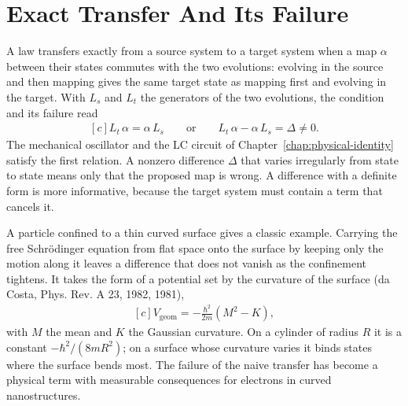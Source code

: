 \documentclass[11pt,oneside]{book}
\newenvironment{centeredalign}{\[\begin{gathered}[c]}{\end{gathered}\]}
\begin{document}
\section{Exact Transfer And Its Failure}
A law transfers exactly from a source system to a target system when a map \(\alpha\) between their states commutes with
the two evolutions: evolving in the source and then mapping gives the same target state as mapping first and evolving in
the target. With \(L_s\) and \(L_t\) the generators of the two evolutions, the condition and its failure read
\begin{centeredalign}
L_t\,\alpha=\alpha\,L_s\qquad\text{or}\qquad L_t\,\alpha-\alpha\,L_s=\Delta\ne0 .
\end{centeredalign}
The mechanical oscillator and the LC circuit of Chapter~\ref{chap:physical-identity} satisfy the first relation. A
nonzero difference \(\Delta\) that varies irregularly from state to state means only that the proposed map is wrong. A
difference with a definite form is more informative, because the target system must contain a term that cancels it.

A particle confined to a thin curved surface gives a classic example. Carrying the free Schr\"odinger equation from
flat space onto the surface by keeping only the motion along it leaves a difference that does not vanish as the
confinement tightens. It takes the form of a potential set by the curvature of the surface (da Costa, Phys. Rev. A 23,
1982, 1981),
\begin{centeredalign}
V_{\mathrm{geom}}=-\frac{\hbar^2}{2m}\left(M^2-K\right),
\end{centeredalign}
with \(M\) the mean and \(K\) the Gaussian curvature. On a cylinder of radius \(R\) it is a constant
\(-\hbar^2/(8mR^2)\); on a surface whose curvature varies it binds states where the surface bends most. The failure of the
naive transfer has become a physical term with measurable consequences for electrons in curved nanostructures.
\end{document}
